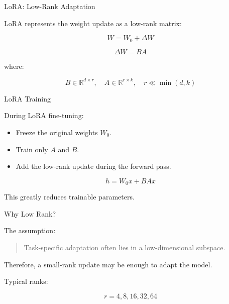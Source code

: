 \documentclass[aspectratio=169]{beamer}
\begin{document}
\begin{frame}{LoRA: Low-Rank Adaptation}

LoRA represents the weight update as a low-rank matrix:

\[
W
=
W_0
+
\Delta W
\]

\[
\Delta W
=
BA
\]

where:

\[
B \in \mathbb{R}^{d \times r},
\quad
A \in \mathbb{R}^{r \times k},
\quad
r \ll \min(d,k)
\]

\end{frame}

\begin{frame}{LoRA Training}

During LoRA fine-tuning:

\begin{itemize}
    \item Freeze the original weights $W_0$.
    \item Train only $A$ and $B$.
    \item Add the low-rank update during the forward pass.
\end{itemize}

\vspace{0.5cm}

\[
h = W_0x + BAx
\]

\vspace{0.5cm}

This greatly reduces trainable parameters.

\end{frame}

\begin{frame}{Why Low Rank?}

The assumption:

\begin{quote}
Task-specific adaptation often lies in a low-dimensional subspace.
\end{quote}

\vspace{0.5cm}

Therefore, a small-rank update may be enough to adapt the model.

\vspace{0.5cm}

Typical ranks:

\[
r = 4, 8, 16, 32, 64
\]

\end{frame}
\end{document}
